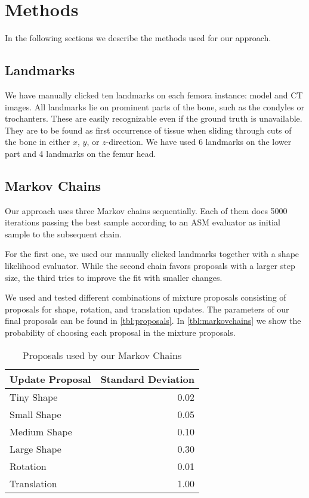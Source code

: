 \section{Methods}
\label{sec:methods}

In the following sections we describe the methods used for our approach.


\subsection{Landmarks}
\label{subsec:landmarks}

We have manually clicked ten landmarks on each femora instance: model and CT images.
All landmarks lie on prominent parts of the bone, such as the condyles or trochanters.
These are easily recognizable even if the ground truth is unavailable.
They are to be found as first occurrence of tissue when sliding through cuts of the bone in either $x$, $y$, or $z$-direction. 
We have used 6 landmarks on the lower part and 4 landmarks on the femur head.


\subsection{Markov Chains}
\label{subsec:markovchains}

Our approach uses three Markov chains sequentially. 
Each of them does 5000 iterations passing the best sample according to an ASM evaluator as initial sample to the subsequent chain.

For the first one, we used our manually clicked landmarks together with a shape likelihood evaluator.
While the second chain favors proposals with a larger step size, the third tries to improve the fit with smaller changes.

We used and tested different combinations of mixture proposals consisting of proposals for shape, rotation, and translation updates. 
The parameters of our final proposals can be found in \autoref{tbl:proposals}. 
In \autoref{tbl:markovchains} we show the probability of choosing each proposal in the mixture proposals.

\begin{table}
  \centering
  \caption{Proposals used by our Markov Chains}
  \label{tbl:proposals}
  \begin{tabular}{lr}
    \toprule
      \textbf{Update Proposal} &
      Standard Deviation \\
    \midrule
      Tiny Shape & 0.02 \\
      Small Shape & 0.05 \\
      Medium Shape & 0.10 \\
      Large Shape & 0.30 \\
      Rotation & 0.01 \\
      Translation & 1.00 \\
    \bottomrule
  \end{tabular}
\end{table}

